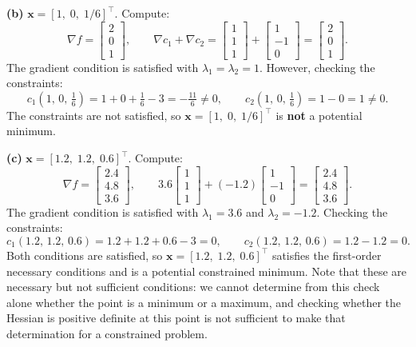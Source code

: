 \begin{solution}
    \textbf{(b)} $\mathbf{x} = [1,\; 0,\; 1/6]^\top$. Compute:
    \[
        \nabla f =
        \begin{bmatrix} 2 \\ 0 \\ 1 \end{bmatrix},
        \qquad
        \nabla c_1 + \nabla c_2 =
        \begin{bmatrix} 1 \\ 1 \\ 1 \end{bmatrix}
        +
        \begin{bmatrix} 1 \\ -1 \\ 0 \end{bmatrix}
        =
        \begin{bmatrix} 2 \\ 0 \\ 1 \end{bmatrix}.
    \]
    The gradient condition is satisfied with $\lambda_1 = \lambda_2 = 1$. However, checking the constraints:
    \[
        c_1\!\left(1,\, 0,\, \tfrac{1}{6}\right) = 1 + 0 + \tfrac{1}{6} - 3 = -\tfrac{11}{6} \neq 0,
        \qquad
        c_2\!\left(1,\, 0,\, \tfrac{1}{6}\right) = 1 - 0 = 1 \neq 0.
    \]
    The constraints are not satisfied, so $\mathbf{x} = [1,\; 0,\; 1/6]^\top$ is \textbf{not} a potential minimum.

    \textbf{(c)} $\mathbf{x} = [1.2,\; 1.2,\; 0.6]^\top$. Compute:
    \[
        \nabla f =
        \begin{bmatrix} 2.4 \\ 4.8 \\ 3.6 \end{bmatrix},
        \qquad
        3.6
        \begin{bmatrix} 1 \\ 1 \\ 1 \end{bmatrix}
        +(-1.2)
        \begin{bmatrix} 1 \\ -1 \\ 0 \end{bmatrix}
        =
        \begin{bmatrix} 2.4 \\ 4.8 \\ 3.6 \end{bmatrix}.
    \]
    The gradient condition is satisfied with $\lambda_1 = 3.6$ and $\lambda_2 = -1.2$. Checking the constraints:
    \[
        c_1(1.2,\, 1.2,\, 0.6) = 1.2 + 1.2 + 0.6 - 3 = 0,
        \qquad
        c_2(1.2,\, 1.2,\, 0.6) = 1.2 - 1.2 = 0.
    \]
    Both conditions are satisfied, so $\mathbf{x} = [1.2,\; 1.2,\; 0.6]^\top$ satisfies the first-order necessary conditions and is a potential constrained minimum. Note that these are necessary but not sufficient conditions: we cannot determine from this check alone whether the point is a minimum or a maximum, and checking whether the Hessian is positive definite at this point is not sufficient to make that determination for a constrained problem.
\end{solution}

